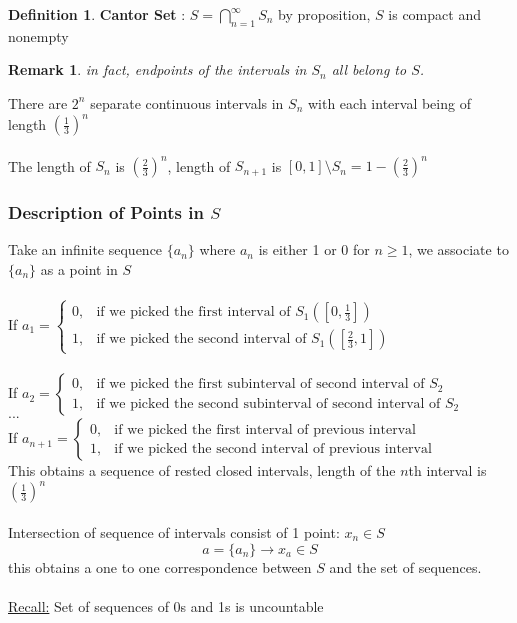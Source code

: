 \documentclass[12pt]{article}
\theoremstyle{plain}
\newtheorem*{remark}{Remark}
\theoremstyle{definition}
\newtheorem{definition}[theorem]{Definition}
\begin{document}
\begin{definition}
	\textbf{Cantor Set} : $S = \bigcap^\infty_{n=1} S_n$ by proposition, $S$ is compact and nonempty
\end{definition}

\begin{remark}
	in fact, endpoints of the intervals in $S_n$ all belong to $S$.
\end{remark}

There are $2^n$ separate continuous intervals in $S_n$ with each interval being of length $(\frac{1}{3})^n$\\
\\
The length of $S_n$ is $(\frac{2}{3})^n$, length of $S_{n+1}$ is $[0,1] \setminus S_n = 1-(\frac{2}{3})^n$

\subsubsection{Description of Points in $S$}

Take an infinite sequence $\{ a_n \}$ where $a_n$ is either 1 or 0 for $n \geq 1$, we associate to $\{ a_n \}$ as a point in $S$\\
\\
If $a_1 = \begin{cases}
	0, &\text{if we picked the first interval of $S_1 ([0,\frac{1}{3}])$}\\
	1, &\text{if we picked the second interval of $S_1 ([\frac{2}{3},1])$}
\end{cases}$\\
\\
If $a_2 = \begin{cases}
	0, &\text{if we picked the first subinterval of second interval of $S_2$}\\
	1, &\text{if we picked the second subinterval of second interval of $S_2$}
\end{cases}$
\\
$...$
\\
If $a_{n+1} = \begin{cases}
	0, &\text{if we picked the first interval of previous interval}\\
	1, &\text{if we picked the second interval of previous interval}
\end{cases}$
\\
This obtains a sequence of rested closed intervals, length of the $n$th interval is $(\frac{1}{3})^n$\\
\\
Intersection of sequence of intervals consist of 1 point: $x_n \in S$
$$a = \{ a_n \} \to x_a \in S$$
this obtains a one to one correspondence between $S$ and the set of sequences.\\
\\
\underline{Recall:} Set of sequences of 0s and 1s is uncountable
\end{document}
